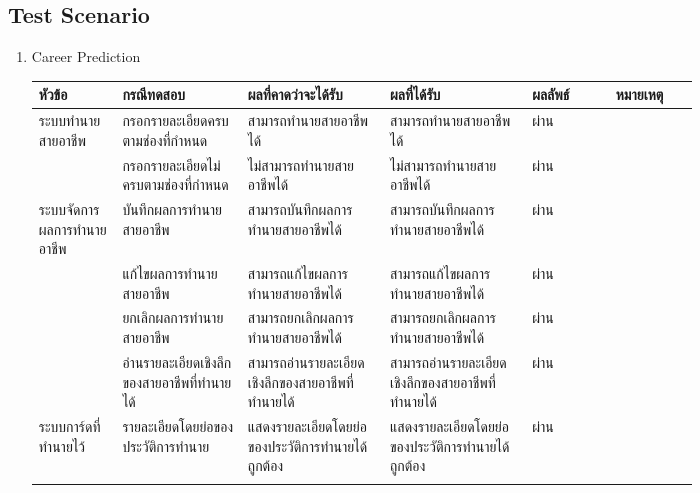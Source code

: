 \subsection{Test Scenario}
\begin{enumerate}
    \item Career Prediction
          \begin{longtable}{|>{\raggedright\arraybackslash}p{0.1\linewidth}|>{\raggedright\arraybackslash}p{0.15\linewidth}|>{\raggedright\arraybackslash}p{0.17\linewidth}|>{\raggedright\arraybackslash}p{0.17\linewidth}|>{\centering}p{0.1\linewidth}|>{\raggedright\arraybackslash}p{0.1\linewidth}|} \hline
              หัวข้อ                   & กรณีทดสอบ                              & ผลที่คาดว่าจะได้รับ                              & ผลที่ได้รับ                                     & ผลลัพธ์ & หมายเหตุ \\ \hline
              \endhead
              ระบบทำนายสายอาชีพ        & กรอกรายละเอียดครบตามช่องที่กำหนด           & สามารถทำนายสายอาชีพได้                         & สามารถทำนายสายอาชีพได้                         & ผ่าน   &         \\ \cline{2-6}
                                     & กรอกรายละเอียดไม่ครบตามช่องที่กำหนด         & ไม่สามารถทำนายสายอาชีพได้                       & ไม่สามารถทำนายสายอาชีพได้                       & ผ่าน   &         \\ \hline
              ระบบจัดการผลการทำนายอาชีพ & บันทึกผลการทำนายสายอาชีพ                  & สามารถบันทึกผลการทำนายสายอาชีพได้                & สามารถบันทึกผลการทำนายสายอาชีพได้                & ผ่าน   &         \\ \cline{2-6}
                                     & แก้ไขผลการทำนายสายอาชีพ                  & สามารถแก้ไขผลการทำนายสายอาชีพได้                & สามารถแก้ไขผลการทำนายสายอาชีพได้                & ผ่าน   &         \\ \cline{2-6}
                                     & ยกเลิกผลการทำนายสายอาชีพ                 & สามารถยกเลิกผลการทำนายสายอาชีพได้               & สามารถยกเลิกผลการทำนายสายอาชีพได้               & ผ่าน   &         \\ \cline{2-6}
                                     & อ่านรายละเอียดเชิงลึกของสายอาชีพที่ทำนายได้    & สามารถอ่านรายละเอียดเชิงลึกของสายอาชีพที่ทำนายได้    & สามารถอ่านรายละเอียดเชิงลึกของสายอาชีพที่ทำนายได้    & ผ่าน   &         \\ \hline
              ระบบการ์ดที่ทำนายไว้        & รายละเอียดโดยย่อของประวัติการทำนาย         & แสดงรายละเอียดโดยย่อของประวัติการทำนายได้ถูกต้อง    & แสดงรายละเอียดโดยย่อของประวัติการทำนายได้ถูกต้อง    & ผ่าน   &         \\ \cline{2-6}

\end{longtable}
\end{enumerate}
